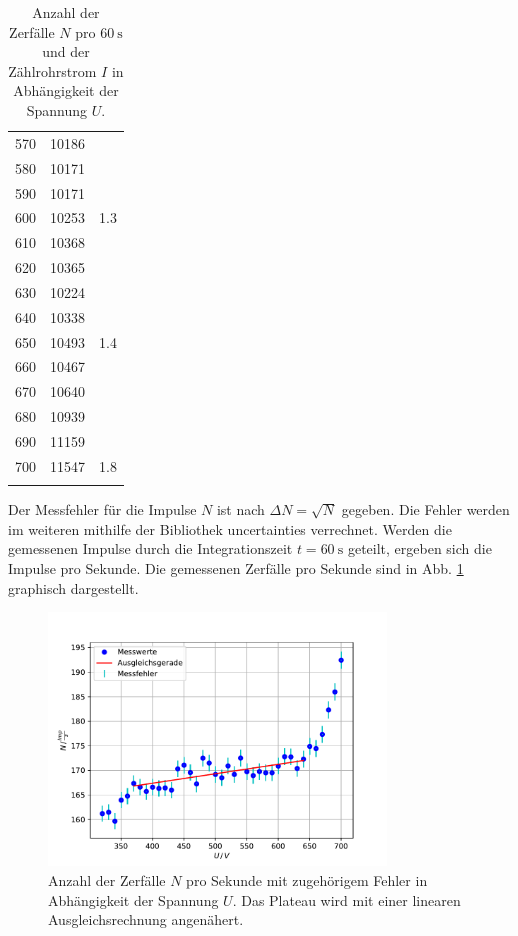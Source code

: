 \begin{table}
\begin{tabular}{ccc}
    570 & 10186 \\
    580 & 10171 \\
    590 & 10171 \\
    600 & 10253 & 1.3 \\
    610 & 10368 \\
    620 & 10365 \\
    630 & 10224 \\
    640 & 10338 \\
    650 & 10493 & 1.4\\
    660 & 10467 \\
    670 & 10640 \\
    680 & 10939 \\
    690 & 11159 \\
    700 & 11547 & 1.8 \\
        &       \\
    \bottomrule
    \end{tabular}
    \caption{Anzahl der Zerfälle $N$ pro $\SI{60}{\second}$ und der Zählrohrstrom $I$ in Abhängigkeit der Spannung $U$.}
    \label{tab:charakteristik}
\end{table}
Der Messfehler für die Impulse $N$ ist nach $\Delta N = \sqrt{N}$ gegeben.
Die Fehler werden im weiteren mithilfe der Bibliothek \glqq uncertainties \grqq \cite{uncertainties} verrechnet.
Werden die gemessenen Impulse durch die Integrationszeit $t = \SI{60}{\second}$  geteilt, ergeben sich die Impulse pro Sekunde.
Die gemessenen Zerfälle pro Sekunde sind in Abb. \ref{fig:char_plot} graphisch dargestellt.
\begin{figure}
    \centering
    \includegraphics[width=0.8\textwidth]{content/data/charakteristik.pdf}
    \caption{Anzahl der Zerfälle $N$ pro Sekunde mit zugehörigem Fehler in Abhängigkeit der Spannung $U$. Das Plateau wird mit einer linearen Ausgleichsrechnung angenähert. \cite{numpy} \cite{matplotlib} \cite{scipy} \cite{uncertainties}}
    \label{fig:char_plot}
\end{figure}
